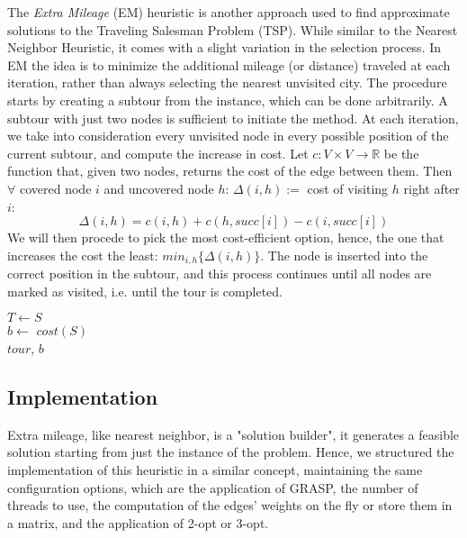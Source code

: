 The \textit{Extra Mileage} (EM) heuristic is another approach used to find approximate solutions to the Traveling Salesman Problem (TSP).
While similar to the Nearest Neighbor Heuristic, it comes with a slight variation in the selection process. 
In EM the idea is to minimize the additional mileage (or distance) traveled at each iteration, rather than always selecting the nearest unvisited city.
The procedure starts by creating a subtour from the instance, which can be done arbitrarily.
A subtour with just two nodes is sufficient to initiate the method.
At each iteration, we take into consideration every unvisited node in every possible position of the current subtour, and compute the increase in cost.
Let $c : V \times V \rightarrow \mathbb{R}$ be the function that, given two nodes, returns the cost of the edge between them.
Then $\forall$ covered node $i$ and uncovered node $h$: $\Delta(i,h) := $ cost of visiting $h$ right after $i$:
\[
    \Delta(i,h) = c(i,h) + c(h, succ[i]) - c(i, succ[i])
\]
We will then procede to pick the most cost-efficient option, hence, the one that increases the cost the least: $min_{i,h}\{\Delta(i,h)\}$.
The node is inserted into the correct position in the subtour, and this process continues until all nodes are marked as visited, i.e. until the tour is completed.

\begin{algorithm}[H]
    \BlankLine
    $T \gets S$\\
    $b \gets$ $cost(S)$\\
    \Return $tour$, $b$\\
    
\end{algorithm}

\subsection{Implementation}
Extra mileage, like nearest neighbor, is a "solution builder", it generates a feasible solution starting from just the 
instance of the problem. Hence, we structured the implementation of this heuristic in a similar concept, maintaining the 
same configuration options, which are the application of GRASP, the number of threads to use, the computation of the edges' 
weights on the fly or store them in a matrix, and the application of 2-opt or 3-opt.

